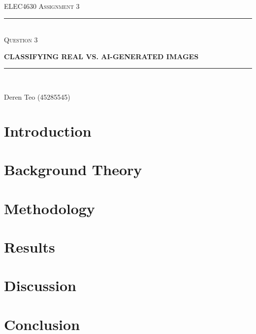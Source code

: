 \begin{titlepage}
  \centering

  \textsc{ELEC4630 Assignment 3}\\
  \vspace{9cm}

  \rule{\linewidth}{0.5pt}\\

  \vspace{1em}
  \LARGE\textsc{Question 3}\\
  \vspace{1em}

  \LARGE\uppercase{\textbf{{Classifying Real vs. AI-Generated Images}}}\\

  \rule{\linewidth}{2pt}\\

  \vfill

  \normalsize{Deren Teo (45285545)}
  \vspace{1cm}

\end{titlepage}

\section{Introduction}

\section{Background Theory}

\section{Methodology}

\section{Results}

\section{Discussion}

\section{Conclusion}
